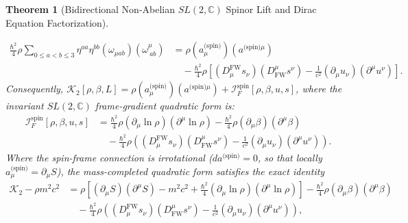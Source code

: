 \documentclass[11pt, a4paper]{article}
\newtheorem{theorem}{Theorem}[section]
\theoremstyle{definition}
\begin{document}
\begin{theorem}[Bidirectional Non-Abelian $SL(2,\mathbb{C})$ Spinor Lift and Dirac Equation Factorization]
\begin{enumerate}[label=(\roman*)]
    \begin{equation}
    \label{eq:mc_velocity_spin_identity}
    \begin{aligned}
    \frac{\hbar^2}{4}\rho \sum_{0 \le a < b \le 3} \eta^{aa}\eta^{bb} (\omega_{\mu ab})(\omega^\mu_{\ ab}) &= \rho\left(a_\mu^{\text{(spin)}}\right)\left(a^{\text{(spin)}\mu}\right) \\
    &\quad - \frac{\hbar^2}{4}\rho \left[ (D_\mu^{\text{FW}} s_\nu)(D_{\text{FW}}^\mu s^\nu) - \frac{1}{c^2}(\partial_\mu u_\nu)(\partial^\mu u^\nu) \right].
    \end{aligned}
    \end{equation}
    Consequently, $\mathcal{K}_2[\rho, \beta, L] = \rho(a_\mu^{\text{(spin)}})(a^{\text{(spin)}\mu}) + \mathcal{I}_F^{\text{spin}}[\rho, \beta, u, s]$, where the invariant $SL(2,\mathbb{C})$ frame-gradient quadratic form is:
    \begin{equation}
    \label{eq:sl2c_fisher_metric_main}
    \begin{aligned}
    \mathcal{I}_F^{\text{spin}}[\rho, \beta, u, s] &= \frac{\hbar^2}{4}\rho(\partial_\mu \ln\rho)(\partial^\mu \ln\rho) - \frac{\hbar^2}{4}\rho(\partial_\mu \beta)(\partial^\mu \beta) \\
    &\quad - \frac{\hbar^2}{4}\rho \left( (D_\mu^{\text{FW}} s_\nu)(D_{\text{FW}}^\mu s^\nu) - \frac{1}{c^2}(\partial_\mu u_\nu)(\partial^\mu u^\nu) \right).
    \end{aligned}
    \end{equation}
    Where the spin-frame connection is irrotational ($da^{\text{(spin)}} = 0$, so that locally $a_\mu^{\text{(spin)}} = \partial_\mu S$), the mass-completed quadratic form satisfies the exact identity
    \begin{equation}
    \label{eq:spinor_scalar_reduction}
    \begin{aligned}
    \mathcal{K}_2 - \rho m^2 c^2 &= \rho\left[ (\partial_\mu S)(\partial^\mu S) - m^2 c^2 + \frac{\hbar^2}{4}(\partial_\mu \ln\rho)(\partial^\mu \ln\rho) \right] - \frac{\hbar^2}{4}\rho(\partial_\mu \beta)(\partial^\mu \beta) \\
    &\quad - \frac{\hbar^2}{4}\rho \left( (D_\mu^{\text{FW}} s_\nu)(D_{\text{FW}}^\mu s^\nu) - \frac{1}{c^2}(\partial_\mu u_\nu)(\partial^\mu u^\nu) \right),
    \end{aligned}
    \end{equation}

\end{enumerate}
\end{theorem}
\end{document}
